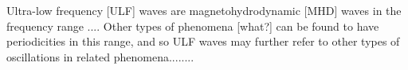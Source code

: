
Ultra-low frequency [ULF] waves are magnetohydrodynamic [MHD] waves in
the frequency range .... Other types of phenomena [what?] can be found
to have periodicities in this range, and so ULF waves may further refer
to other types of oscillations in related phenomena........
